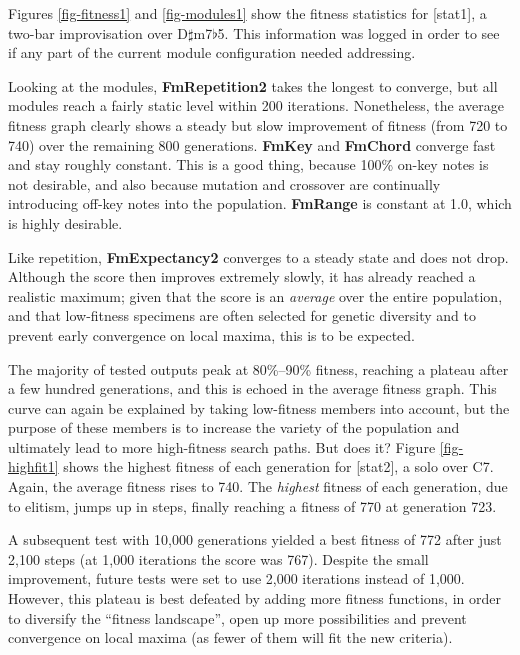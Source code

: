 Figures \ref{fig-fitness1} and \ref{fig-modules1} show the fitness statistics for [stat1], a two-bar improvisation over D$\sharp$m7$\flat$5. This information was logged in order to see if any part of the current module configuration needed addressing.


Looking at the modules, \textbf{FmRepetition2} takes the longest to converge, but all modules reach a fairly static level within 200 iterations. Nonetheless, the average fitness graph clearly shows a steady but slow improvement of fitness (from 720 to 740) over the remaining 800 generations. \textbf{FmKey} and \textbf{FmChord} converge fast and stay roughly constant. This is a good thing, because 100\% on-key notes is not desirable,
and also because mutation and crossover are continually introducing off-key notes into the population. \textbf{FmRange} is constant at 1.0, which is highly desirable.

Like repetition, \textbf{FmExpectancy2} converges to a steady state and does not drop. Although the score then improves extremely slowly, it has already reached a realistic maximum; given that the score is an \emph{average} over the entire population, and that low-fitness specimens are often selected for genetic diversity and to prevent early convergence on local maxima, this is to be expected.


The majority of tested outputs peak at 80\%--90\% fitness, reaching a plateau after a few hundred generations, and this is echoed in the average fitness graph. This curve can again be explained by taking low-fitness members into account, but the purpose of these members is to increase the variety of the population and ultimately lead to more high-fitness search paths. But does it? Figure \ref{fig-highfit1} shows the highest fitness of each generation for [stat2], a solo over C7. Again, the average fitness rises to 740. The \emph{highest} fitness of each generation, due to elitism, jumps up in steps, finally reaching a fitness of 770 at generation 723.

A subsequent test with 10,000 generations yielded a best fitness of 772 after just 2,100 steps (at 1,000 iterations the score was 767). Despite the small improvement, future tests were set to use 2,000 iterations instead of 1,000. However, this plateau is best defeated by adding more fitness functions, in order to diversify the ``fitness landscape'', open up more possibilities and prevent convergence on local maxima (as fewer of them will fit the new criteria).

